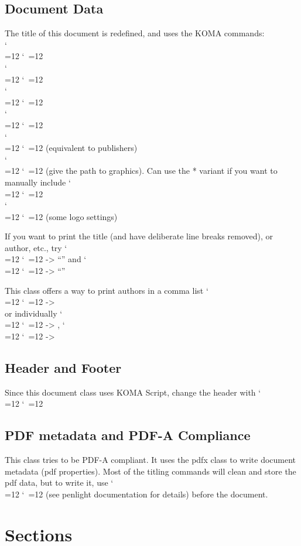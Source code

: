 \documentclass{\FormatDir corpboreportMulti}
\def\cmd{\bgroup\catcode`\\=12 \catcode`\ =12 \cmdA}
\def\cmdA#1{\egroup{\texttt{\detokenize{#1}}}}
\begin{document}
\subsection{Document Data}
The title of this document is redefined, and uses the KOMA commands:\\
\cmd{\title{}}\\
\cmd{\subtitle{}}\\
\cmd{\author{}}\\
\cmd{\date{}}\\
\cmd{\company{}} (equivalent to publishers)\\
\cmd{\logo{}} (give the path to graphics). Can use the * variant if you want to manually include \cmd{\includegraphics}\\
\cmd{\logoset} (some logo settings)

If you want to print the title (and have deliberate line breaks removed), or author, etc.,
try \cmd{\thetitle} -> ``\thetitle'' and \cmd{\theauthor} -> ``\theauthor''

This class offers a way to print authors in a comma list \cmd{\theauthors} -> \theauthors\\
or individually \cmd{\theauthors[1]} -> \theauthors[1], \cmd{\theauthors[2]} -> \theauthors[2]\\

\begin{itemize}
  \listauthors
\end{itemize}

\subsection{Header and Footer}
Since this document class uses KOMA Script, change the header with
\cmd{\lohead{}, \rohead{}}




\subsection{PDF metadata and PDF-A Compliance}

This class tries to be PDF-A compliant.
It uses the pdfx class to write document metadata (pdf properties).
Most of the titling commands will clean and store the pdf data, but to write it,
use \cmd{\writePDFmetadata} (see penlight documentation for details) before the document.


\section{Sections}\label{s.sett}
\end{document}
